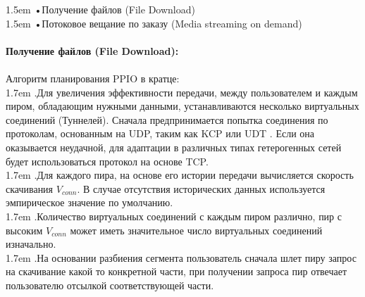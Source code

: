 \documentclass[10pt,a4paper]{article}
\begin{document}
\hangindent 1.5em
\noindent   
•\quad Получение файлов (File Download)
\vspace{-0.8em}
\\ 

\hangindent 1.5em
\noindent   
•\quad Потоковое вещание по заказу (Media streaming on demand) \cite{article4}
\vspace{-1.5em}
\\ 

\noindent
\\{\bf Получение файлов (File Download):}
\vspace{-0.6em}
\\\\Алгоритм планирования PPIO в кратце:
\vspace{-0.6em}
\\ 

\hangindent 1.7em
.\quad Для увеличения эффективности передачи, между пользователем и каждым пиром, обладающим нужными данными, устанавливаются несколько виртуальных соединений (Туннелей). Сначала предпринимается попытка соединения по протоколам, основанным на UDP, таким как KCP или UDT \cite{article13}. Если она оказывается неудачной, для адаптации в различных типах гетерогенных сетей будет использоваться протокол на основе TCP.
\vspace{-0.8em}
\\ 

\hangindent 1.7em
.\quad Для каждого пира, на основе его истории передачи вычисляется скорость скачивания $V_{conn}$. В случае отсутствия исторических данных используется эмпирическое значение по умолчанию.
\vspace{-0.8em}
\\ 

\hangindent 1.7em
.\quad Количество виртуальных соединений с каждым пиром различно, пир с высоким $V_{conn}$ может иметь значительное число виртуальных соединений изначально.
\vspace{-0.8em}
\\ 

\hangindent 1.7em
.\quad На основании разбиения сегмента пользователь сначала шлет пиру запрос на скачивание какой то конкретной части, при получении запроса пир отвечает пользователю отсылкой соответствующей части.
\vspace{-0.8em}
\\ 
\end{document}
